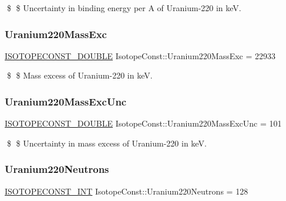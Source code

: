 \$ \$ Uncertainty in binding energy per A of Uranium-\/220 in keV. \mbox{\label{group___isotope_const-_uranium-_u220_gac8e136c0a32df3f03e0dae7af4fc93b7}} 
\subsubsection{\texorpdfstring{Uranium220\+Mass\+Exc}{Uranium220MassExc}}
{\footnotesize\ttfamily \mbox{\hyperlink{group___isotope_const-_macros_ga8f45a7272ce02c0b4c65c44636ed719a}{I\+S\+O\+T\+O\+P\+E\+C\+O\+N\+S\+T\+\_\+\+D\+O\+U\+B\+LE}} Isotope\+Const\+::\+Uranium220\+Mass\+Exc = 22933}

\$ \$ Mass excess of Uranium-\/220 in keV. \mbox{\label{group___isotope_const-_uranium-_u220_ga565ea78756853156d2dcac600a9d2e35}} 
\subsubsection{\texorpdfstring{Uranium220\+Mass\+Exc\+Unc}{Uranium220MassExcUnc}}
{\footnotesize\ttfamily \mbox{\hyperlink{group___isotope_const-_macros_ga8f45a7272ce02c0b4c65c44636ed719a}{I\+S\+O\+T\+O\+P\+E\+C\+O\+N\+S\+T\+\_\+\+D\+O\+U\+B\+LE}} Isotope\+Const\+::\+Uranium220\+Mass\+Exc\+Unc = 101}

\$ \$ Uncertainty in mass excess of Uranium-\/220 in keV. \mbox{\label{group___isotope_const-_uranium-_u220_ga810fb93d188c9867efd234e0d4fab607}} 
\subsubsection{\texorpdfstring{Uranium220\+Neutrons}{Uranium220Neutrons}}
{\footnotesize\ttfamily \mbox{\hyperlink{group___isotope_const-_macros_ga5f18360b3e99483a35c32d789e62621c}{I\+S\+O\+T\+O\+P\+E\+C\+O\+N\+S\+T\+\_\+\+I\+NT}} Isotope\+Const\+::\+Uranium220\+Neutrons = 128}


